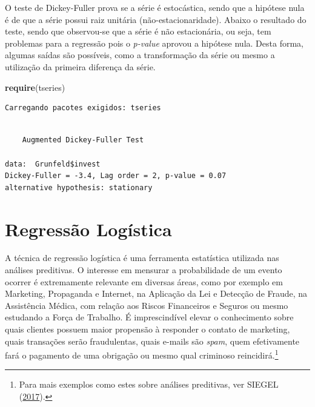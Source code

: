 \documentclass[12pt,brazil,oneside]{book}
\newenvironment{Shaded}{\begin{snugshade}}{\end{snugshade}}
\newcommand{\DataTypeTok}[1]{\textcolor[rgb]{0.13,0.29,0.53}{#1}}
\newcommand{\DecValTok}[1]{\textcolor[rgb]{0.00,0.00,0.81}{#1}}
\newcommand{\KeywordTok}[1]{\textcolor[rgb]{0.13,0.29,0.53}{\textbf{#1}}}
\newcommand{\NormalTok}[1]{#1}
\newcommand{\OperatorTok}[1]{\textcolor[rgb]{0.81,0.36,0.00}{\textbf{#1}}}
\let\rmarkdownfootnote\footnote%
\def\footnote{\protect\rmarkdownfootnote}
\begin{document}
O teste de Dickey-Fuller prova se a série é estocástica, sendo que a hipótese nula é de que a série possui raiz unitária (não-estacionaridade). Abaixo o resultado do teste, sendo que observou-se que a série é não estacionária, ou seja, tem problemas para a regressão pois o \emph{p-value} aprovou a hipótese nula. Desta forma, algumas saídas são possíveis, como a transformação da série ou mesmo a utilização da primeira diferença da série.

\begin{Shaded}
\begin{Highlighting}[]
\KeywordTok{require}\NormalTok{(tseries)}
\end{Highlighting}
\end{Shaded}

\begin{verbatim}
Carregando pacotes exigidos: tseries
\end{verbatim}

\begin{Shaded}
\end{Shaded}

\begin{verbatim}

    Augmented Dickey-Fuller Test

data:  Grunfeld$invest
Dickey-Fuller = -3.4, Lag order = 2, p-value = 0.07
alternative hypothesis: stationary
\end{verbatim}

\hypertarget{regressao-logistica}{%
\chapter{Regressão Logística}\label{regressao-logistica}}

A técnica de regressão logística é uma ferramenta estatística utilizada nas análises preditivas. O interesse em mensurar a probabilidade de um evento ocorrer é extremamente relevante em diversas áreas, como por exemplo em Marketing, Propaganda e Internet, na Aplicação da Lei e Detecção de Fraude, na Assistência Médica, com relação aos Riscos Financeiros e Seguros ou mesmo estudando a Força de Trabalho. É imprescindível elevar o conhecimento sobre quais clientes possuem maior propensão à responder o contato de marketing, quais transações serão fraudulentas, quais e-mails são \emph{spam}, quem efetivamente fará o pagamento de uma obrigação ou mesmo qual criminoso reincidirá.\footnote{Para mais exemplos como estes sobre análises preditivas, ver SIEGEL (\protect\hyperlink{ref-Siegel2017}{2017}).}
\end{document}

